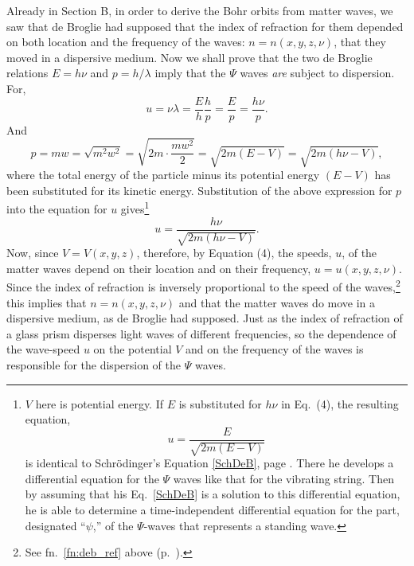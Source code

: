 Already in Section B, in order to derive the Bohr orbits from matter
waves, we saw that de Broglie had supposed that the index of refraction
for them depended on both location and the frequency of the waves:
$n = n(x,y,z,\nu)$, that they moved in a dispersive medium.
Now we shall prove that the two de Broglie relations $E =h\nu$ and 
$p = h/\lambda$ imply that the $\Psi$ waves
\emph{are} subject to dispersion. For,
\begin{equation*}
u = \nu\lambda = \frac{E}{h}\frac{h}{p} = \frac{E}{p} = \frac{h\nu}{p}.
\end{equation*}
And
\begin{equation*}
p = mw = \sqrt{m^2w^2} = \sqrt{2m\cdot\frac{mw^2}{2}} = \sqrt{2m(E-V)}
= \sqrt{2m(h\nu - V)},
\end{equation*}
where the total energy of the particle minus its potential energy $(E - V)$ has
been substituted for its kinetic energy. Substitution of the above
expression for $p$ into the equation for $u$ gives\footnote{$V$ here is potential energy. If $E$ is substituted
  for $h\nu$ in Eq.~(4), the resulting equation,
  \begin{equation*}
  u = \frac{E}{\sqrt{2m(E-V)}}
  \end{equation*}
  is identical to Schrödinger's Equation \eqref{SchDeB}, page \pageref{SchDeB}. There he
  develops a differential equation for the $\Psi$ waves like that for
  the vibrating string. Then by assuming that his Eq.\ \eqref{SchDeB} is a
  solution to this differential equation, he is able to determine a
  time-independent differential equation for the part, designated
  ``$\psi$,'' of the $\Psi$-waves that represents a standing wave.}
\begin{equation*}\tag{4}\label{eq:deb_4}
u = \frac{h\nu}{\sqrt{2m(h\nu -V)}}.
\end{equation*}
Now, since $V=V(x,y,z)$, therefore, by Equation (4),
the speeds, $u$, of the matter waves depend on their location and
on their frequency, $u = u(x,y,z,\nu)$. Since
the index of refraction is inversely proportional to the speed of the
waves,\footnote{See fn.~\ref{fn:deb_ref} above (p.~\pageref{fn:deb_ref}).}
 this implies that $n = n(x,y,z,\nu)$ and that 
the matter waves do move in a dispersive
medium, as de Broglie had supposed. Just as the index of refraction of a
glass prism disperses light waves of different frequencies, so the
dependence of the wave-speed $u$ on the potential $V$ and on
the frequency of the waves is responsible for the dispersion of the
$\Psi$ waves.

